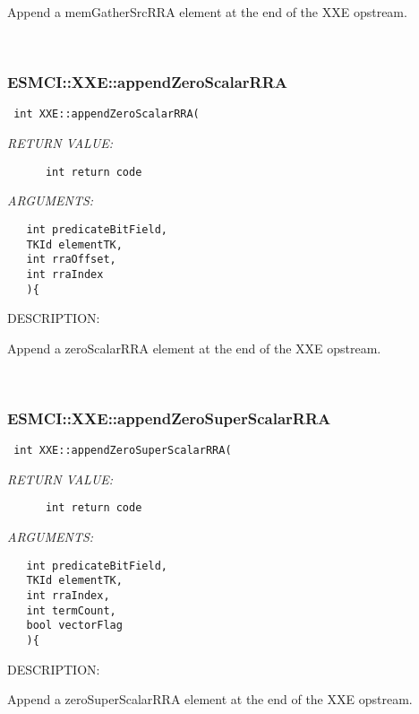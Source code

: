     Append a memGatherSrcRRA element at the end of the XXE opstream. 
 
\mbox{}\hrulefill\
 
\subsubsection [ESMCI::XXE::appendZeroScalarRRA] {ESMCI::XXE::appendZeroScalarRRA}


  
\begin{verbatim} int XXE::appendZeroScalarRRA(\end{verbatim}{\em RETURN VALUE:}
\begin{verbatim}      int return code\end{verbatim}{\em ARGUMENTS:}
\begin{verbatim}   int predicateBitField,
   TKId elementTK,
   int rraOffset,
   int rraIndex
   ){\end{verbatim}
{\sf DESCRIPTION:\\ }


    Append a zeroScalarRRA element at the end of the XXE opstream. 
 
\mbox{}\hrulefill\
 
\subsubsection [ESMCI::XXE::appendZeroSuperScalarRRA] {ESMCI::XXE::appendZeroSuperScalarRRA}


  
\begin{verbatim} int XXE::appendZeroSuperScalarRRA(\end{verbatim}{\em RETURN VALUE:}
\begin{verbatim}      int return code\end{verbatim}{\em ARGUMENTS:}
\begin{verbatim}   int predicateBitField,
   TKId elementTK,
   int rraIndex,
   int termCount,
   bool vectorFlag
   ){\end{verbatim}
{\sf DESCRIPTION:\\ }


    Append a zeroSuperScalarRRA element at the end of the XXE opstream. 
 
